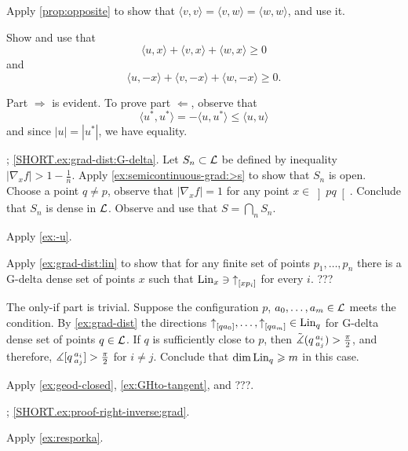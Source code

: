 Apply \ref{prop:opposite} to show that 
$\langle v,v\rangle =\langle v,w\rangle=\langle w,w\rangle$,
and use it.

 Show and use that
\[\langle u,x\rangle +\langle v,x\rangle +\langle w,x\rangle \ge 0\]
and
\[\langle u,-x\rangle +\langle v,-x\rangle +\langle w,-x\rangle \ge 0.\]

 Part $\Rightarrow$ is evident.
To prove part $\Leftarrow$, observe that 
\[\langle u^*,u^*\rangle =-\langle u,u^*\rangle\le \langle u,u\rangle\]
and since $|u|=|u^*|$, we have equality.

\parbf{\ref{ex:grad-dist}};
\ref{SHORT.ex:grad-dist:G-delta}.
Let $S_n\subset \mathcal{L}$ be defined by inequality $|\nabla_xf|>1-\tfrac1n$.
Apply \ref{ex:semicontinuous-grad:>s} to show that $S_n$ is open.
Choose a point $q\ne p$, observe that $|\nabla_xf|=1$ for any point $x\in\left]pq\right[$.
Conclude that $S_n$ is dense in $\mathcal{L}$.
Observe and use that $S=\bigcap_nS_n$.

Apply \ref{ex:-u}.

Apply \ref{ex:grad-dist:lin} to show that for any finite set of points $p_1,\dots,p_n$ there is a G-delta dense set of points $x$ such that $\mathop{\rm Lin}\nolimits_x\ni {\uparrow}_{[{x}{p_i}]}$ for every $i$.
???


 The only-if part is trivial.
Suppose the configuration $p$, $a_0,\z\dots, a_{m}\in \spc{L}$ meets the condition.
By \ref{ex:grad-dist} the directions $\dir q{a_0},\z\dots,\dir q{a_m}\in \Lin_q$ for G-delta dense set of points $q\in \mathcal{L}$.
If $q$ is sufficiently close to $p$, then $\tilde\measuredangle(q\,{}^{a_i}_{a_j})>\tfrac\pi2$,
and therefore, $\measuredangle[q\,{}^{a_i}_{a_j}]>\tfrac\pi2$ for $i\ne j$.
Conclude that $\operatorname{\rm dim}\nolimits\mathop{\rm Lin}\nolimits_q\geqslant m$ in this case.

Apply \ref{ex:geod-closed}, \ref{ex:GHto-tangent}, and ???.

\parbf{\ref{ex:proof-right-inverse}}; \ref{SHORT.ex:proof-right-inverse:grad}.

\parit{\ref{SHORT.ex:proof-right-inverse:alpha}}

\parit{\ref{SHORT.ex:proof-right-inverse:end}}

\parit{\ref{SHORT.ex:proof-right-inverse:dim}}

 Apply \ref{ex:resporka}.

